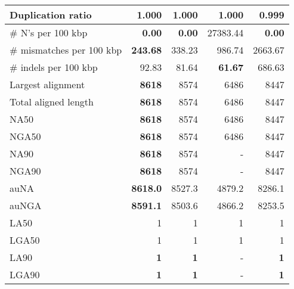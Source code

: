 \documentclass[12pt,a4paper]{article}
\begin{document}
\begin{table}[ht]
\begin{center}
\begin{tabular}{|l*{4}{|r}|}
Duplication ratio & 1.000 & 1.000 & 1.000 & {\bf 0.999} \\ \hline
\# N's per 100 kbp & {\bf 0.00} & {\bf 0.00} & 27383.44 & {\bf 0.00} \\ \hline
\# mismatches per 100 kbp & {\bf 243.68} & 338.23 & 986.74 & 2663.67 \\ \hline
\# indels per 100 kbp & 92.83 & 81.64 & {\bf 61.67} & 686.63 \\ \hline
Largest alignment & {\bf 8618} & 8574 & 6486 & 8447 \\ \hline
Total aligned length & {\bf 8618} & 8574 & 6486 & 8447 \\ \hline
NA50 & {\bf 8618} & 8574 & 6486 & 8447 \\ \hline
NGA50 & {\bf 8618} & 8574 & 6486 & 8447 \\ \hline
NA90 & {\bf 8618} & 8574 & - & 8447 \\ \hline
NGA90 & {\bf 8618} & 8574 & - & 8447 \\ \hline
auNA & {\bf 8618.0} & 8527.3 & 4879.2 & 8286.1 \\ \hline
auNGA & {\bf 8591.1} & 8503.6 & 4866.2 & 8253.5 \\ \hline
LA50 & 1 & 1 & 1 & 1 \\ \hline
LGA50 & 1 & 1 & 1 & 1 \\ \hline
LA90 & {\bf 1} & {\bf 1} & - & {\bf 1} \\ \hline
LGA90 & {\bf 1} & {\bf 1} & - & {\bf 1} \\ \hline
\end{tabular}
\end{center}
\end{table}
\end{document}
